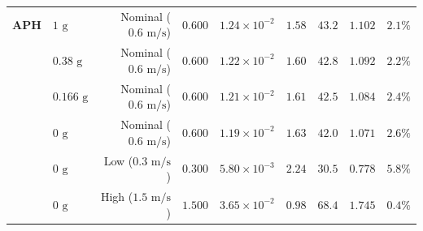 \begin{table}[t]
\begin{tabularx}{\textwidth}{llrcccccc}
\midrule
\textbf{APH} & $1\text{ g}$ & Nominal ($0.6\text{ m/s}$) & $0.600$ & $1.24 \times 10^{-2}$ & $1.58$ & $43.2$ & $1.102$ & $2.1\%$ \\
& $0.38\text{ g}$ & Nominal ($0.6\text{ m/s}$) & $0.600$ & $1.22 \times 10^{-2}$ & $1.60$ & $42.8$ & $1.092$ & $2.2\%$ \\
& $0.166\text{ g}$ & Nominal ($0.6\text{ m/s}$) & $0.600$ & $1.21 \times 10^{-2}$ & $1.61$ & $42.5$ & $1.084$ & $2.4\%$ \\
& $0\text{ g}$ & Nominal ($0.6\text{ m/s}$) & $0.600$ & $1.19 \times 10^{-2}$ & $1.63$ & $42.0$ & $1.071$ & $2.6\%$ \\
& $0\text{ g}$ & Low ($0.3\text{ m/s}$) & $0.300$ & $5.80 \times 10^{-3}$ & $2.24$ & $30.5$ & $0.778$ & $5.8\%$ \\
& $0\text{ g}$ & High ($1.5\text{ m/s}$) & $1.500$ & $3.65 \times 10^{-2}$ & $0.98$ & $68.4$ & $1.745$ & $0.4\%$ \\
\bottomrule
\end{tabularx}
\end{table}
